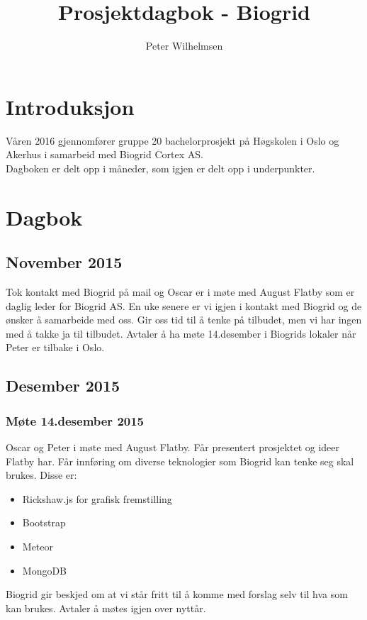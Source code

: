 \documentclass[12pt, oneside]{article}
\title{Prosjektdagbok - Biogrid}
\author{Peter Wilhelmsen}
\begin{document}
\maketitle
\pagebreak

\section{Introduksjon}
Våren 2016 gjennomfører gruppe 20 bachelorprosjekt på Høgskolen i Oslo og Akerhus i samarbeid med Biogrid Cortex AS. \\
Dagboken er delt opp i måneder, som igjen er delt opp i underpunkter. 

\section{Dagbok}


\subsection{November 2015}
Tok kontakt med Biogrid på mail og Oscar er i møte med August Flatby som er daglig leder for Biogrid AS.
En uke senere er vi igjen i kontakt med Biogrid og de ønsker å samarbeide med oss. Gir oss tid til å tenke på tilbudet, men vi har ingen med å takke ja til tilbudet. Avtaler å ha møte 14.desember i Biogrids lokaler når Peter er tilbake i Oslo.


\subsection{Desember 2015}
\subsubsection{Møte 14.desember 2015}
Oscar og Peter i møte med August Flatby. Får presentert prosjektet og ideer Flatby har. Får innføring om diverse teknologier som Biogrid kan tenke seg skal brukes. Disse er:  
\begin{itemize}
	\item Rickshaw.js for grafisk fremstilling
	\item Bootstrap
	\item Meteor
	\item MongoDB
\end{itemize}
Biogrid gir beskjed om at vi står fritt til å komme med forslag selv til hva som kan brukes. Avtaler å møtes igjen over nyttår.
\end{document}

